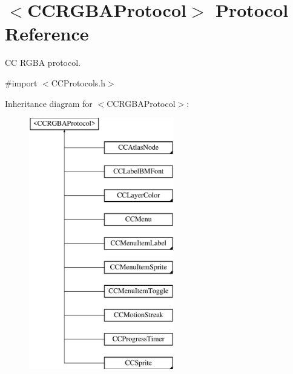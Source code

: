 \hypertarget{protocol_c_c_r_g_b_a_protocol-p}{\section{$<$C\-C\-R\-G\-B\-A\-Protocol$>$ Protocol Reference}
\label{protocol_c_c_r_g_b_a_protocol-p}
}


C\-C R\-G\-B\-A protocol.  




{\ttfamily \#import $<$C\-C\-Protocols.\-h$>$}

Inheritance diagram for $<$C\-C\-R\-G\-B\-A\-Protocol$>$\-:\begin{figure}[H]
\begin{center}
\leavevmode
\includegraphics[height=11.000000cm]{protocol_c_c_r_g_b_a_protocol-p}
\end{center}
\end{figure}
